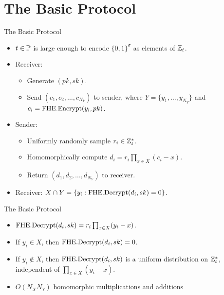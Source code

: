\section{The Basic Protocol}

\begin{frame}{The Basic Protocol}
\begin{itemize}
\item $t\in\P$ is large enough to encode $\{0, 1\}^\sigma$ as elements of $\Z_t$.
\item Receiver:
\begin{itemize}
\item Generate $(pk, sk)$.
\item Send $(c_1, c_2, \dots, c_{N_Y})$ to sender, where $Y=\{y_1, \dots, y_{N_Y}\}$ and $c_i=\fenc(y_i, pk)$.
\end{itemize}
\item Sender:
\begin{itemize}
\item Uniformly randomly sample $r_i\in\Z_t^*$.
\item Homomorphically compute $d_i=r_i\prod_{x\in X}(c_i-x)$.
\item Return $(d_1, d_2, \dots, d_{N_Y})$ to receiver.
\end{itemize}
\item Receiver: $X\cap Y=\{y_i: \fdec(d_i, sk)=0\}$.
\end{itemize}
\end{frame}

\begin{frame}{The Basic Protocol}
\begin{itemize}
\item $\fdec(d_i, sk)=r_i\prod_{x\in X}(y_i-x)$.
\item If $y_i\in X$, then $\fdec(d_i, sk)=0$.
\item If $y_i\notin X$, then $\fdec(d_i, sk)$ is a uniform distribution on $\Z_t^*$, independent of $\prod_{x\in X}(y_i-x)$.
\item $O(N_XN_Y)$ homomorphic multiplications and additions
\end{itemize}
\end{frame}
